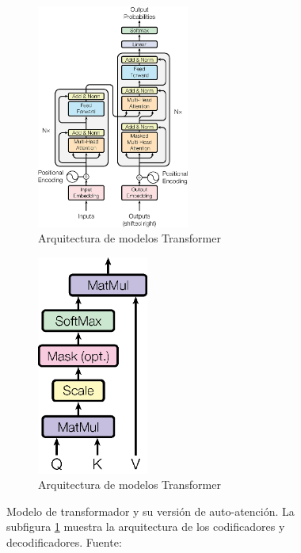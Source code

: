 \begin{figure}[t]
    \centering
    \begin{subfigure}[]{0.55\textwidth}
        \centering
        \includegraphics[width=0.55\textwidth]{img/02/transformer_architecture.png}
        \caption{Arquitectura de modelos Transformer}
        \label{fig:transformer_architecture}
    \end{subfigure}
    \begin{subfigure}[]{0.40\textwidth}
        \centering
        \includegraphics[width=0.40\textwidth]{img/02/scaled_self_attention.png}
        \caption{Arquitectura de modelos Transformer}
        \label{fig:scaled_self_attention}
    \end{subfigure}
    \caption{Modelo de transformador y su versión de auto-atención. La subfigura \ref{fig:transformer_architecture} muestra la arquitectura de los codificadores y decodificadores. Fuente: \citet{vaswani2017attention}}
    \label{fig:transformer_mechanism}
\end{figure}

